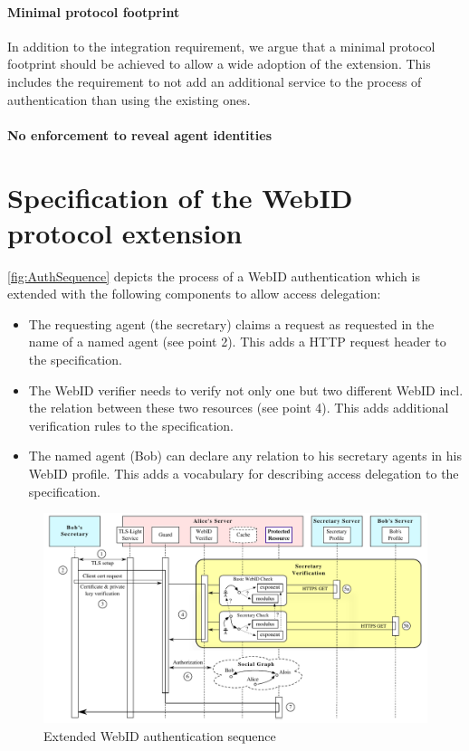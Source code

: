 \documentclass[a4paper]{llncs}
\begin{document}
\paragraph{Minimal protocol footprint}

In addition to the integration requirement, we argue that a minimal protocol footprint should be achieved to allow a wide adoption of the extension.
This includes the requirement to not add an additional service to the process of authentication than using the existing ones.

\paragraph{No enforcement to reveal agent identities}
 

\section{Specification of the WebID protocol extension}\label{sec:spec}

\autoref{fig:AuthSequence} depicts the process of a WebID authentication which is extended with the following components to allow access delegation:

\begin{itemize}
    \item The requesting agent (the secretary) claims a request as requested in the name of a named agent (see point 2).
        This adds a HTTP request header to the specification.
    \item The WebID verifier needs to verify not only one but two different WebID incl. the relation between these two resources (see point 4).
        This adds additional verification rules to the specification.
    \item The named agent (Bob) can declare any relation to his secretary agents in his WebID profile.
        This adds a vocabulary for describing access delegation to the specification.
\end{itemize}

\begin{figure}[htb]
  \centering
  \includegraphics[width=\textwidth]{AuthSequence}
  \caption{Extended WebID authentication sequence}
  \label{fig:AuthSequence}
\end{figure}
\end{document}
